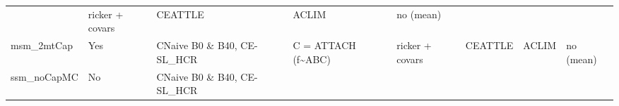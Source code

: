 \documentclass[]{article}
\begin{document}
\begin{longtable}[]{@{}llllllll@{}}
\begin{minipage}[t]{0.10\columnwidth}
\end{minipage} & \begin{minipage}[t]{0.11\columnwidth}\raggedright\strut
ricker + covars\strut
\end{minipage} & \begin{minipage}[t]{0.10\columnwidth}\raggedright\strut
CEATTLE\strut
\end{minipage} & \begin{minipage}[t]{0.08\columnwidth}\raggedright\strut
ACLIM\strut
\end{minipage} & \begin{minipage}[t]{0.05\columnwidth}\raggedright\strut
no (mean)\strut
\end{minipage}\tabularnewline
\begin{minipage}[t]{0.16\columnwidth}\raggedright\strut
msm\_2mtCap\strut
\end{minipage} & \begin{minipage}[t]{0.06\columnwidth}\raggedright\strut
Yes\strut
\end{minipage} & \begin{minipage}[t]{0.13\columnwidth}\raggedright\strut
CNaive B0 \& B40, CE-SL\_HCR\strut
\end{minipage} & \begin{minipage}[t]{0.10\columnwidth}\raggedright\strut
C = ATTACH (f\textasciitilde{}ABC)\strut
\end{minipage} & \begin{minipage}[t]{0.11\columnwidth}\raggedright\strut
ricker + covars\strut
\end{minipage} & \begin{minipage}[t]{0.10\columnwidth}\raggedright\strut
CEATTLE\strut
\end{minipage} & \begin{minipage}[t]{0.08\columnwidth}\raggedright\strut
ACLIM\strut
\end{minipage} & \begin{minipage}[t]{0.05\columnwidth}\raggedright\strut
no (mean)\strut
\end{minipage}\tabularnewline
\begin{minipage}[t]{0.16\columnwidth}\raggedright\strut
ssm\_noCapMC\strut
\end{minipage} & \begin{minipage}[t]{0.06\columnwidth}\raggedright\strut
No\strut
\end{minipage} & \begin{minipage}[t]{0.13\columnwidth}\raggedright\strut
CNaive B0 \& B40, CE-SL\_HCR\strut

\end{minipage}
\end{longtable}
\end{document}
